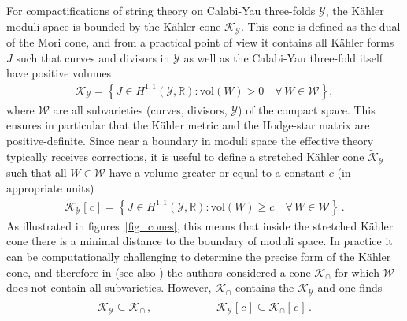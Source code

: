 \documentclass[12pt,a4paper]{article}
\newcommand{\eq}[1]{\begin{equation}
                     \begin{split} #1 \end{split}
                     \end{equation}}
\newcommand{\op}{\hspace{1pt}}
\numberwithin{equation}{section}
\begin{document}
For compactifications of string theory on Calabi-Yau three-folds $\mathcal Y$,
the K\"ahler moduli space is bounded by the K\"ahler cone $\mathcal K_{\mathcal Y}$. 
This cone is defined as the dual of the Mori cone, and from a practical
point of view
it contains all K\"ahler forms $J$ such that curves and divisors in $\mathcal Y$
as well as the 
Calabi-Yau three-fold itself have positive volumes
\eq{
  \mathcal K_{\mathcal Y} = \left\{ 
  J \in H^{1,1}(\mathcal Y,\mathbb R) : 
  \textrm{vol}(W) >0 \quad\forall \,W \in \mathcal W\right\} ,
}
where $\mathcal W$ are all subvarieties (curves, divisors, $\mathcal Y$) of 
the compact space. 
This ensures in particular that the K\"ahler metric and the Hodge-star matrix are positive-definite. 
Since near a boundary in moduli space the effective theory 
typically receives corrections, it is useful to define 
a stretched K\"ahler cone $\widetilde{\mathcal K}_{\mathcal Y}$
such that all $W\in\mathcal W$ have a volume greater or equal 
to a constant $c$ (in appropriate units)
\eq{
  \label{skcone}
  \widetilde{\mathcal K}_{\mathcal Y}[\op c\op] = \left\{ 
  J \in H^{1,1}(\mathcal Y,\mathbb R) : 
  \textrm{vol}(W) \geq c \quad\forall \,W \in \mathcal W\right\} \,.
}
As illustrated in figures~\ref{fig_cones}, this means that inside the stretched K\"ahler cone 
there is a minimal distance to the boundary 
of moduli space.
In practice it can be computationally challenging to determine
the precise form of the K\"ahler cone, and therefore in \cite{Demirtas:2018akl} 
(see also \cite{Cicoli:2018tcq})
the authors 
considered a cone $\mathcal K_{\cap}$ for which $\mathcal W$ does not contain 
all subvarieties.  However, $\mathcal K_{\cap}$ contains the
$\mathcal K_{\mathcal Y}$ and one finds
\eq{
 \mathcal K_{\mathcal Y}\subseteq  \mathcal K_{\cap} \,,
 \hspace{70pt}
 \widetilde{\mathcal K}_{\mathcal Y}[\op c\op] \subseteq  \widetilde{\mathcal K}_{\cap}[\op c\op] \,.
}
\end{document}

